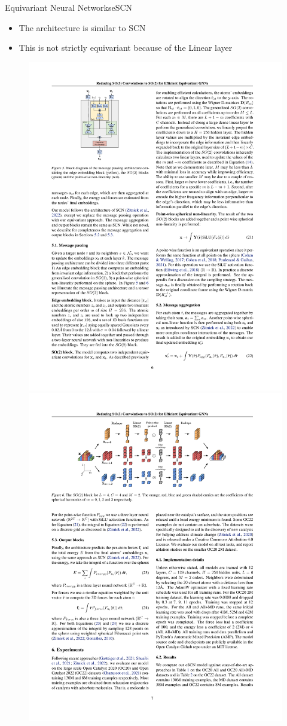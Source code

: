 \documentclass[pdf,serif]{beamer}
\begin{document}
\begin{frame}{Equivariant Neural Networks}{eSCN}
    \begin{itemize}
        \item The architecture is similar to SCN
        \item This is not strictly equivariant because of the Linear layer
    \end{itemize}
    \vspace*{1em}
    \begin{figure}
        \includegraphics[width=0.19\linewidth]{images/escn1}
        \hfill
        \includegraphics[width=0.79\linewidth]{images/escn2}
    \end{figure}
\end{frame}
\end{document}
